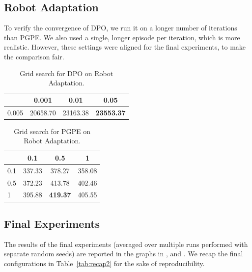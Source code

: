 \subsection*{Robot Adaptation}
To verify the convergence of \ac{DPO}, we run it on a longer number of iterations than \ac{PGPE}. We also used a single, longer episode per iteration, which is more realistic. However, these settings were aligned for the final experiments, to make the comparison fair.
\begin{table}[H]
	\centering
	\begin{tabular}{l|*{3}{c}}
		\toprule
		\backslashbox{$\alpha$}{$\lambda$}
		&0.001&0.01&0.05\\
		\midrule
		0.005 & 20658.70 & 23163.38 & \textbf{23553.37} \\
		\bottomrule
	\end{tabular} \caption{\label{tab:t4}Grid search for \ac{DPO} on Robot Adaptation.}
\end{table}
\begin{table}[H]
	\centering
	\begin{tabular}{l|*{3}{c}}
		\toprule
		\backslashbox{$\alpha$}{$\sigma$}
		&0.1&0.5&1\\
		\midrule
		0.1 & 337.33 & 378.27 & 358.08 \\
		0.5 & 372.23 & 413.78 & 402.46 \\
		1 & 395.88 & \textbf{419.37}	 & 405.55 \\
		\bottomrule
	\end{tabular} \caption{\label{tab:t5}Grid search for \ac{PGPE} on Robot Adaptation.}
\end{table}

\subsection{Final Experiments}
The results of the final experiments (averaged over multiple runs performed with separate random seeds) are reported in the graphs in ,  and . 
We recap the final configurations in Table~\ref{tab:recap2} for the sake of reproducibility.

